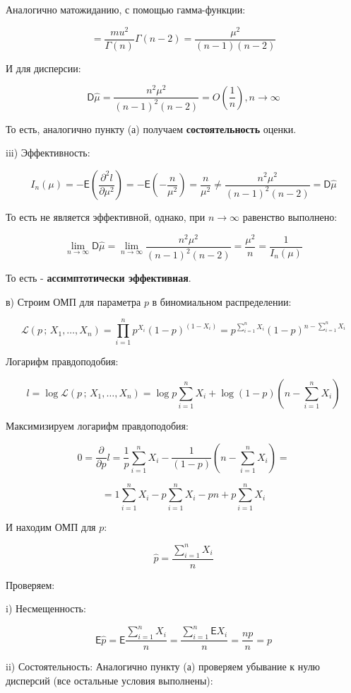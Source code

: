 \documentclass[12pt]{article}
\theoremstyle{definiton}
\theoremstyle{definition}
\theoremstyle{definition}
\newcommand{\Expect}{\mathsf{E}}
\newcommand{\Disp}{\mathsf{D}}
\begin{document}
Аналогично матожиданию, с помощью гамма-функции:

$$= \frac{mu^2}{\Gamma(n)} \Gamma(n-2) = \frac{\mu^2}{(n-1)(n-2)}$$

И для дисперсии:

$$\Disp \hat\mu = \frac{n^2 \mu^2}{(n-1)^2(n-2)} = O\left(\frac1n\right), n \to \infty$$

То есть, аналогично пункту (а) получаем \textbf{состоятельность} оценки.

iii) Эффективность:

$$I_n(\mu) = -  \Expect \left(\frac{\partial^2 l}{\partial \mu^2}\right) = -\Expect \left( - \frac{n}{\mu^2}\right) = \frac{n}{\mu^2} \neq  \frac{n^2 \mu^2}{(n-1)^2(n-2)} = \Disp \hat\mu$$

То есть не является эффективной, однако, при $n \to \infty$ равенство выполнено:

$$\lim_{n \to \infty} \Disp \hat\mu = \lim_{n \to \infty} \frac{n^2 \mu^2}{(n-1)^2(n-2)} =  \frac{\mu^2}{n} = \frac{1}{I_n(\mu)}$$

То есть -\textbf{ ассимптотически эффективная}.

\bigskip

в) Строим ОМП для параметра $p$ в биномиальном распределении:

$$\mathcal{L}(p \,;\,X_1,\ldots,X_n) = \prod\limits_{i=1}^n p^{X_i} (1-p)^{(1 - X_i)} = p^{\sum\limits_{i=1}^n X_i} (1-p)^{n - \sum\limits_{i=1}^n X_i}$$

Логарифм правдоподобия:

$$l = \log \mathcal{L}(p \,;\,X_1,\ldots,X_n) =  \log{p} \sum\limits_{i=1}^n X_i + \log{(1-p)} (n - \sum\limits_{i=1}^n X_i) $$

Максимизируем логарифм правдоподобия:

$$0 = \frac{\partial}{\partial p} l = \frac1p \sum\limits_{i=1}^n X_i - \frac{1}{(1-p)} (n - \sum\limits_{i=1}^n X_i) = $$

$$  = 1 \sum\limits_{i=1}^n X_i  - p \sum\limits_{i=1}^n X_i  - p n + p \sum\limits_{i=1}^n X_i$$

И находим ОМП для $p$:

$$\hat p = \frac{ \sum\limits_{i=1}^n X_i}{n}$$ 

Проверяем: 

i) Несмещенность:

$$\Expect \hat p  = \Expect \frac{ \sum\limits_{i=1}^n X_i}{n} =  \frac{ \sum\limits_{i=1}^n \Expect X_i}{n} = \frac{np}{n} = p$$

ii) Состоятельность: Аналогично пункту (а) проверяем убывание к нулю дисперсий (все остальные условия выполнены):
\end{document}
